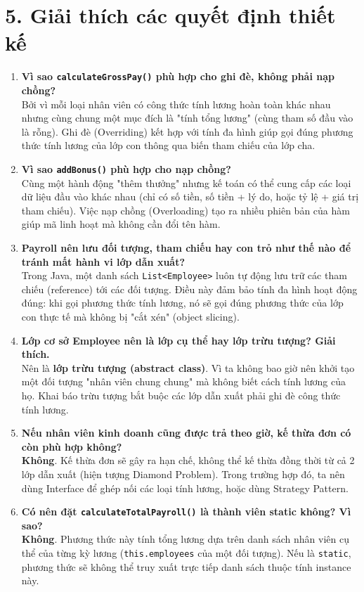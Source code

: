 \documentclass[12pt,a4paper]{article}
\begin{document}
\section{5. Giải thích các quyết định thiết kế}
\begin{enumerate}
    \item \textbf{Vì sao \texttt{calculateGrossPay()} phù hợp cho ghi đè, không phải nạp chồng?} \\
    Bởi vì mỗi loại nhân viên có công thức tính lương hoàn toàn khác nhau nhưng cùng chung một mục đích là "tính tổng lương" (cùng tham số đầu vào là rỗng). Ghi đè (Overriding) kết hợp với tính đa hình giúp gọi đúng phương thức tính lương của lớp con thông qua biến tham chiếu của lớp cha.
    
    \item \textbf{Vì sao \texttt{addBonus()} phù hợp cho nạp chồng?} \\
    Cùng một hành động "thêm thưởng" nhưng kế toán có thể cung cấp các loại dữ liệu đầu vào khác nhau (chỉ có số tiền, số tiền + lý do, hoặc tỷ lệ + giá trị tham chiếu). Việc nạp chồng (Overloading) tạo ra nhiều phiên bản của hàm giúp mã linh hoạt mà không cần đổi tên hàm.
    
    \item \textbf{Payroll nên lưu đối tượng, tham chiếu hay con trỏ như thế nào để tránh mất hành vi lớp dẫn xuất?} \\
    Trong Java, một danh sách \texttt{List<Employee>} luôn tự động lưu trữ các tham chiếu (reference) tới các đối tượng. Điều này đảm bảo tính đa hình hoạt động đúng: khi gọi phương thức tính lương, nó sẽ gọi đúng phương thức của lớp con thực tế mà không bị "cắt xén" (object slicing).
    
    \item \textbf{Lớp cơ sở Employee nên là lớp cụ thể hay lớp trừu tượng? Giải thích.} \\
    Nên là \textbf{lớp trừu tượng (abstract class)}. Vì ta không bao giờ nên khởi tạo một đối tượng "nhân viên chung chung" mà không biết cách tính lương của họ. Khai báo trừu tượng bắt buộc các lớp dẫn xuất phải ghi đè công thức tính lương.
    
    \item \textbf{Nếu nhân viên kinh doanh cũng được trả theo giờ, kế thừa đơn có còn phù hợp không?} \\
    \textbf{Không}. Kế thừa đơn sẽ gây ra hạn chế, không thể kế thừa đồng thời từ cả 2 lớp dẫn xuất (hiện tượng Diamond Problem). Trong trường hợp đó, ta nên dùng Interface để ghép nối các loại tính lương, hoặc dùng Strategy Pattern.
    
    \item \textbf{Có nên đặt \texttt{calculateTotalPayroll()} là thành viên static không? Vì sao?} \\
    \textbf{Không}. Phương thức này tính tổng lương dựa trên danh sách nhân viên cụ thể của từng kỳ lương (\texttt{this.employees} của một đối tượng). Nếu là \texttt{static}, phương thức sẽ không thể truy xuất trực tiếp danh sách thuộc tính instance này.
\end{enumerate}
\end{document}
